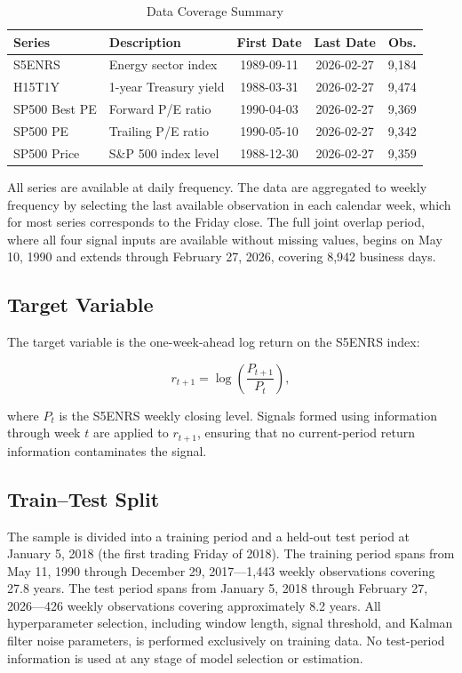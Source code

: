 \documentclass[12pt]{article}
\begin{document}
\begin{table}[H]
\centering
\caption{Data Coverage Summary}
\label{tab:data}
\begin{tabular}{llccc}
\toprule
Series & Description & First Date & Last Date & Obs. \\
\midrule
S5ENRS & Energy sector index & 1989-09-11 & 2026-02-27 & 9,184 \\
H15T1Y & 1-year Treasury yield & 1988-03-31 & 2026-02-27 & 9,474 \\
SP500 Best PE & Forward P/E ratio & 1990-04-03 & 2026-02-27 & 9,369 \\
SP500 PE & Trailing P/E ratio & 1990-05-10 & 2026-02-27 & 9,342 \\
SP500 Price & S\&P 500 index level & 1988-12-30 & 2026-02-27 & 9,359 \\
\bottomrule
\end{tabular}
\end{table}

All series are available at daily frequency. The data are aggregated to weekly frequency by selecting the last available observation in each calendar week, which for most series corresponds to the Friday close. The full joint overlap period, where all four signal inputs are available without missing values, begins on May 10, 1990 and extends through February 27, 2026, covering 8,942 business days.

\subsection{Target Variable}

The target variable is the one-week-ahead log return on the S5ENRS index:

\begin{equation}
r_{t+1} = \log\!\left(\frac{P_{t+1}}{P_t}\right),
\label{eq:target}
\end{equation}

where $P_t$ is the S5ENRS weekly closing level. Signals formed using information through week $t$ are applied to $r_{t+1}$, ensuring that no current-period return information contaminates the signal.

\subsection{Train–Test Split}

The sample is divided into a training period and a held-out test period at January 5, 2018 (the first trading Friday of 2018). The training period spans from May 11, 1990 through December 29, 2017—1,443 weekly observations covering 27.8 years. The test period spans from January 5, 2018 through February 27, 2026—426 weekly observations covering approximately 8.2 years. All hyperparameter selection, including window length, signal threshold, and Kalman filter noise parameters, is performed exclusively on training data. No test-period information is used at any stage of model selection or estimation.
\end{document}
